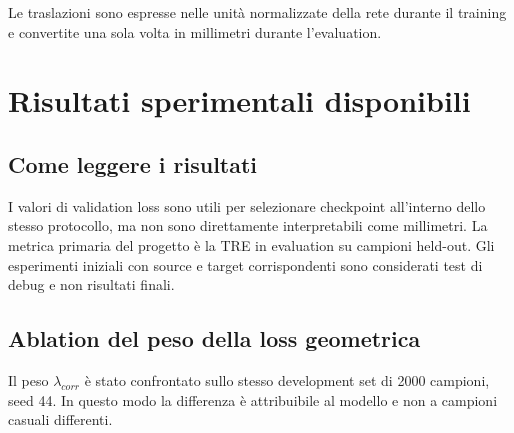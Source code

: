\documentclass[11pt,a4paper]{article}
\begin{document}
Le traslazioni sono espresse nelle unità normalizzate della rete durante il
training e convertite una sola volta in millimetri durante l'evaluation.

\section{Risultati sperimentali disponibili}

\subsection{Come leggere i risultati}

I valori di validation loss sono utili per selezionare checkpoint all'interno
dello stesso protocollo, ma non sono direttamente interpretabili come
millimetri. La metrica primaria del progetto è la TRE in evaluation su campioni
held-out. Gli esperimenti iniziali con source e target corrispondenti sono
considerati test di debug e non risultati finali.

\subsection{Ablation del peso della loss geometrica}

Il peso $\lambda_{corr}$ è stato confrontato sullo stesso development set di
2000 campioni, seed 44. In questo modo la differenza è attribuibile al modello
e non a campioni casuali differenti.

\begin{table}[ht]
\centering
\caption{Ablation di $\lambda_{corr}$ in modalità sweep, development seed 44.
Tutti gli errori lineari sono in millimetri.}
\end{table}
\end{document}
